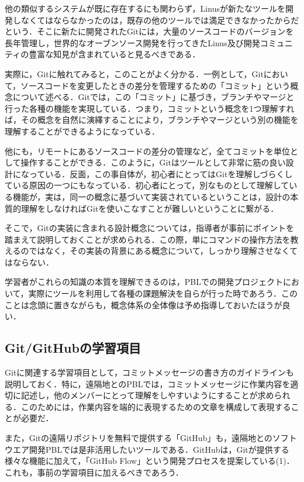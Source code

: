 \documentclass[a4j, 12Q, twocolumn, twoside]{jsarticle}
\begin{document}
他の類似するシステムが既に存在するにも関わらず，Linusが新たなツールを開発しなくてはならなかったのは，既存の他のツールでは満足できなかったからだという．そこに新たに開発されたGitには，大量のソースコードのバージョンを長年管理し，世界的なオーブンソース開発を行ってきたLinus及び開発コミュニティの豊富な知見が含まれていると見るべきである．

実際に，Gitに触れてみると，このことがよく分かる．一例として，Gitにおいて，ソースコードを変更したときの差分を管理するための「コミット」という概念について述べる．Gitでは，この「コミット」に基づき，ブランチやマージと行った各種の機能を実現している．つまり，コミットという概念を1つ理解すれば，その概念を自然に演繹することにより，ブランチやマージという別の機能を理解することができるようになっている．

他にも，リモートにあるソースコードの差分の管理など，全てコミットを単位として操作することができる．このように，Gitはツールとして非常に筋の良い設計になっている．反面，この事自体が，初心者にとってはGitを理解しづらくしている原因の一つにもなっている．初心者にとって，別なものとして理解している機能が，実は，同一の概念に基づいて実装されているということは，設計の本質的理解をしなければGitを使いこなすことが難しいということに繋がる．

そこで，Gitの実装に含まれる設計概念については，指導者が事前にポイントを踏まえて説明しておくことが求められる．この際，単にコマンドの操作方法を教えるのではなく，その実装の背景にある概念について，しっかり理解させなくてはならない．

学習者がこれらの知識の本質を理解できるのは，PBLでの開発プロジェクトにおいて，実際にツールを利用して各種の課題解決を自らが行った時であろう．このことは念頭に置きながらも，概念体系の全体像は予め指導しておいたほうが良い．

\subsection{Git/GitHubの学習項目}
Gitに関連する学習項目として，コミットメッセージの書き方のガイドラインも説明しておく．特に，遠隔地とのPBLでは，コミットメッセージに作業内容を適切に記述し，他のメンバーにとって理解をしやすいようにすることが求められる．このためには，作業内容を端的に表現するための文章を構成して表現することが必要だ．

また，Gitの遠隔リポジトリを無料で提供する「GitHub」も，遠隔地とのソフトウエア開発PBLでは是非活用したいツールである．GitHubは，Gitが提供する様々な機能に加えて，「GitHub Flow」という開発プロセスを提案している(1)．これも，事前の学習項目に加えるべきであろう．
\end{document}
